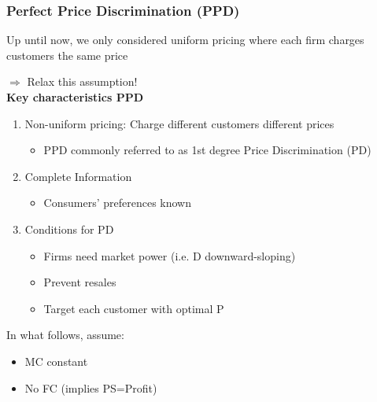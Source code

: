 \documentclass[10pt]{beamer}
\begin{document}
	

	


	

\begin{frame} 
	\frametitle{Perfect Price Discrimination (PPD)}
	
	Up until now, we only considered uniform pricing where each firm charges customers the same price
	
	\smallskip
	$\Longrightarrow$ Relax this assumption!\\
	\bigskip
	\textbf{Key characteristics PPD}
	\begin{enumerate}
		\item Non-uniform pricing: Charge different customers different prices
			\begin{itemize}
				\item PPD commonly referred to as 1st degree Price Discrimination (PD)
			\end{itemize}
		\item Complete Information 
			\begin{itemize}
				\item Consumers' preferences known
			\end{itemize}
		\item Conditions for PD
		\begin{itemize}
			\item Firms need market power (i.e. D downward-sloping)
			\item Prevent resales %
			\item Target each customer with optimal P %
		\end{itemize}
	\end{enumerate}

	\bigskip
		
In what follows, assume:
\begin{itemize}
	\item MC constant
	\item No FC (implies PS=Profit)
\end{itemize}
	
\end{frame}
\end{document}
